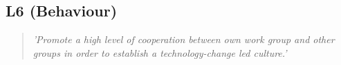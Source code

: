 \subsection{L6 (Behaviour)}

  \begin{quote}
    \textit{'Promote a high level of cooperation
    between own work group and other groups in order to
    establish a technology-change led culture.'}
  \end{quote}

\newpage
